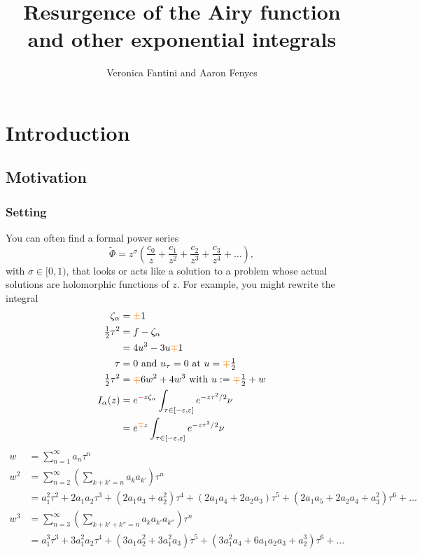 \documentclass{article}
\title{Resurgence of the Airy function \\ and other exponential integrals}
\author{Veronica Fantini and Aaron Fenyes}
\newcommand{\series}{\tilde}
\begin{document}
\maketitle
\section{Introduction}
\subsection{Motivation}
\subsubsection{Setting}
You can often find a formal power series
\[ \series{\Phi} = z^\sigma \left( \frac{c_0}{z} + \frac{c_1}{z^2} + \frac{c_2}{z^3} + \frac{c_3}{z^4} + \ldots \right), \]
with $\sigma \in [0, 1)$, that looks or acts like a solution to a problem whose actual solutions are holomorphic functions of $z$. For example, you might rewrite the integral
\color{SeaGreen}
\begin{align*}
\zeta_\alpha & = \textcolor{orange}{\pm}1 \\
\tfrac{1}{2} \tau^2 & = f - \zeta_\alpha \\
& = 4u^3 - 3u \textcolor{orange}{\mp} 1 \\
\tau & = 0 \text{ and } u_\tau = 0 \text{ at } u = \textcolor{orange}{\mp}\tfrac{1}{2} \\
\tfrac{1}{2} \tau^2 & = \textcolor{orange}{\mp}6w^2 + 4w^3 \text{ with } u := \textcolor{orange}{\mp}\tfrac{1}{2} + w \\
I_\alpha(z) & = e^{\textcolor{magenta}{-}z\zeta_\alpha} \int_{\tau \in [-\varepsilon, \varepsilon]} e^{-z\tau^2/2} \nu \\
& = e^{\textcolor{orange}{\mp}z} \int_{\tau \in [-\varepsilon, \varepsilon]} e^{-z\tau^2/2} \nu
\end{align*}
\begin{align*}
w & = \sum_{n = 1}^\infty a_n \tau^n \\
w^2 & = \sum_{n = 2}^\infty \left( \sum_{k + k' = n} a_k a_{k'} \right) \tau^n \\
& = a_1^2 \tau^2 + 2 a_1 a_2 \tau^3 + (2 a_1 a_3 + a_2^2) \tau^4 + (2 a_1 a_4 + 2 a_2 a_3) \tau^5 + (2 a_1 a_5 + 2 a_2 a_4 + a_3^2) \tau^6 + \ldots \\
w^3 & = \sum_{n = 3}^\infty \left( \sum_{k + k' + k'' = n} a_k a_{k'} a_{k''} \right) \tau^n \\
& = a_1^3 \tau^3 + 3 a_1^2 a_2 \tau^4 + (3a_1 a_2^2 + 3 a_1^2 a_3) \tau^5 + (3 a_1^2 a_4 + 6 a_1 a_2 a_3 + a_2^3) \tau^6 + \ldots
\end{align*}
\end{document}
